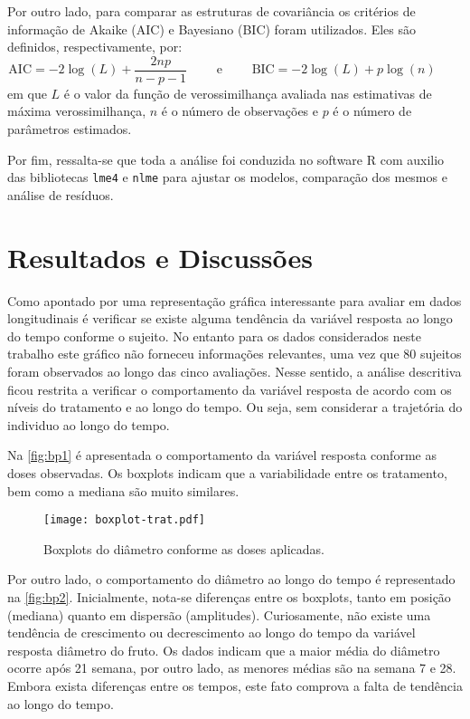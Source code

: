 \documentclass[12pt,a4paper,final]{article}
\begin{document}
Por outro lado, para comparar as estruturas de covariância os critérios de informação de Akaike (AIC) 
e Bayesiano (BIC) foram utilizados. Eles são definidos, respectivamente, por:
\begin{equation}
\textrm{AIC} = -2\log (L)+\dfrac {2np}{n-p-1} \qquad  \text{ e } \qquad
\textrm{BIC} = -2\log (L)+p\log (n) \qquad 
\end{equation}
em que $L$ é o valor da função de verossimilhança avaliada nas estimativas de máxima verossimilhança,
$n$ é o número de observações e $p$ é o número de parâmetros estimados.

Por fim, ressalta-se que toda a análise foi conduzida no software \textsf{R} \cite{RCT2016} com auxilio das
bibliotecas \texttt{lme4} \cite{Bates2015} e \texttt{nlme} \cite{Pinheiro2016}
para ajustar os modelos, comparação dos mesmos e análise de resíduos.

\newpage
\section{Resultados e Discussões}
Como apontado por  uma representação gráfica interessante para avaliar 
em dados longitudinais é verificar se existe alguma tendência da variável resposta
ao longo do tempo conforme o sujeito. No entanto para os dados considerados neste 
trabalho este gráfico não forneceu informações relevantes, uma vez que 80 sujeitos
foram observados ao longo das cinco avaliações. Nesse sentido, a análise descritiva
ficou restrita a verificar o comportamento da variável resposta de acordo com os níveis 
do tratamento e ao longo do tempo. Ou seja, sem considerar a trajetória do individuo ao 
longo do tempo.

Na \autoref{fig:bp1} é apresentada o comportamento da variável resposta conforme as doses
observadas. Os boxplots indicam que a variabilidade entre os tratamento, bem como a mediana
são muito similares. 
\begin{figure}[H]
\centering
\texttt{[image: boxplot-trat.pdf]}
\caption{Boxplots do diâmetro conforme as doses aplicadas.}
\label{fig:bp1}
\end{figure}

Por outro lado, o comportamento do diâmetro ao longo do tempo é representado na \autoref{fig:bp2}.
Inicialmente, nota-se diferenças entre os boxplots, tanto em posição (mediana) quanto em dispersão (amplitudes).
Curiosamente, não existe uma tendência de crescimento ou decrescimento ao longo do tempo da variável resposta
diâmetro do fruto. Os dados indicam que a maior média do diâmetro ocorre após 21 semana, por outro lado,
as menores médias são na semana 7 e 28. Embora exista diferenças entre os tempos, este fato comprova a falta
de tendência ao longo do tempo.
 
\end{document}
